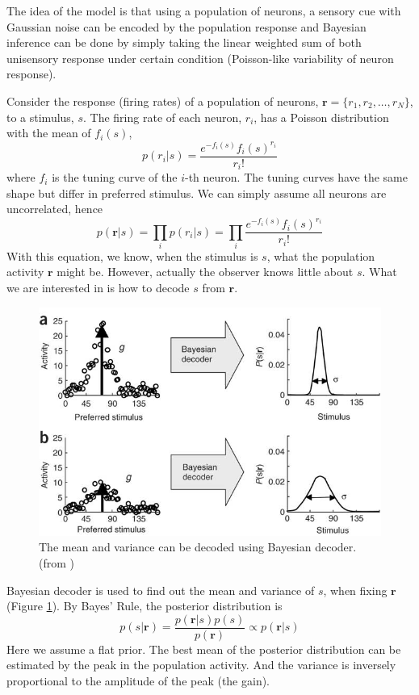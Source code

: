 \documentclass{article}[11pt]
\begin{document}
The idea of the model is that using a population of neurons, a sensory cue with Gaussian noise can be encoded by the population response and Bayesian inference can be done by simply taking the linear weighted sum of both unisensory response under certain condition (Poisson-like variability of neuron response).

Consider the response (firing rates) of a population of neurons, $\mathbf{r} = \{ r_1, r_2, \dots, r_N \}$, to a stimulus, $s$. The firing rate of each neuron, $r_i$, has a Poisson distribution with the mean of $f_i(s)$, 
\begin{equation}
  p(r_i|s) = \frac{e^{-f_i(s)} f_i(s)^{r_i}}{r_i!}
  \label{eq:poisson}
\end{equation}
where $f_i$ is the tuning curve of the $i$-th neuron. The tuning curves have the same shape but differ in preferred stimulus. We can simply assume all neurons are uncorrelated, hence
\begin{equation}
  p(\mathbf{r}|s) = \prod_{i} p(r_i|s) = \prod_{i} \frac{e^{-f_i(s)} f_i(s)^{r_i}}{r_i!}
  \label{eq:popvar}
\end{equation}
With this equation, we know, when the stimulus is $s$, what the population activity $\mathbf{r}$ might be. However, actually the observer knows little about $s$. What we are interested in is how to decode $s$ from $\mathbf{r}$.

\begin{figure}[tpb]
  \centering
  \includegraphics[width=.8\textwidth]{decoder}
  \caption{The mean and variance can be decoded using Bayesian decoder. (from \cite{ma_bayesian_2006})}
  \label{fig:decoder}
\end{figure}

Bayesian decoder is used to find out the mean and variance of $s$, when fixing $\mathbf{r}$ (Figure \ref{fig:decoder}). By Bayes' Rule, the posterior distribution is
\begin{equation}
  p(s|\mathbf{r}) = \frac{p(\mathbf{r}|s)p(s)}{p(\mathbf{r})} \propto p(\mathbf{r}|s)
  \label{eq:posterior}
\end{equation}
Here we assume a flat prior. The best mean of the posterior distribution can be estimated by the peak in the population activity. And the variance is inversely proportional to the amplitude of the peak (the gain).
\end{document}
